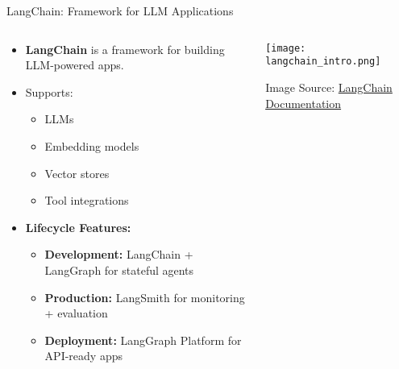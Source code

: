 \documentclass[8pt]{beamer}
\begin{document}
\begin{frame}{LangChain: Framework for LLM Applications}

\begin{columns}

\begin{column}{0.5\textwidth}
\begin{itemize}
    \item \textbf{LangChain} is a framework for building LLM-powered apps.
    \item Supports:
    \begin{itemize}
        \item LLMs
        \item Embedding models
        \item Vector stores
        \item Tool integrations
    \end{itemize}

    \item \textbf{Lifecycle Features:}
    \begin{itemize}
        \item \textbf{Development:} LangChain + LangGraph for stateful agents
        \item \textbf{Production:} LangSmith for monitoring + evaluation
        \item \textbf{Deployment:} LangGraph Platform for API-ready apps
    \end{itemize}
\end{itemize}
\end{column}

\begin{column}{0.5\textwidth}
\centering
\texttt{[image: langchain\_intro.png]} %

\vspace{0.2cm}
\scriptsize{
Image Source: \href{https://python.langchain.com/docs/introduction/}{LangChain Documentation}
}
\end{column}

\end{columns}

\end{frame}
\end{document}
